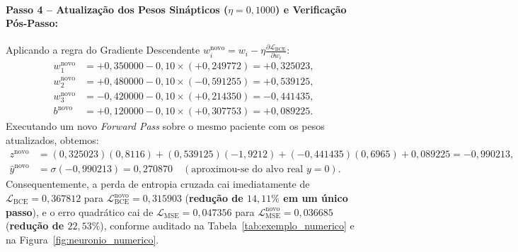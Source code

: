 \documentclass[runningheads]{llncs}
\begin{document}
\paragraph{Passo 4 -- Atualiza\c{c}\~{a}o dos Pesos Sin\'{a}pticos ($\eta = 0{,}1000$) e Verifica\c{c}\~{a}o P\'{o}s-Passo:}
Aplicando a regra do Gradiente Descendente $w_i^{\text{novo}} = w_i - \eta \frac{\partial \mathcal{L}_{\text{BCE}}}{\partial w_i}$:
\begin{align}
    w_1^{\text{novo}} &= +0{,}350000 - 0{,}10 \times (+0{,}249772) = +0{,}325023, \nonumber\\
    w_2^{\text{novo}} &= +0{,}480000 - 0{,}10 \times (-0{,}591255) = +0{,}539125, \nonumber\\
    w_3^{\text{novo}} &= -0{,}420000 - 0{,}10 \times (+0{,}214350) = -0{,}441435, \nonumber\\
    b^{\text{novo}}   &= +0{,}120000 - 0{,}10 \times (+0{,}307753) = +0{,}089225.
\end{align}
Executando um novo \textit{Forward Pass} sobre o mesmo paciente com os pesos atualizados, obtemos:
\begin{align}
    z^{\text{novo}} &= (0{,}325023)(0{,}8116) + (0{,}539125)(-1{,}9212) + (-0{,}441435)(0{,}6965) + 0{,}089225 = -0{,}990213, \nonumber\\
    \hat{y}^{\text{novo}} &= \sigma(-0{,}990213) = 0{,}270870 \quad (\text{aproximou-se do alvo real } y = 0).
\end{align}
Consequentemente, a perda de entropia cruzada cai imediatamente de $\mathcal{L}_{\text{BCE}} = 0{,}367812$ para $\mathcal{L}_{\text{BCE}}^{\text{novo}} = 0{,}315903$ (\textbf{redu\c{c}\~{a}o de $14{,}11\%$ em um \'{u}nico passo}), e o erro quadr\'{a}tico cai de $\mathcal{L}_{\text{MSE}} = 0{,}047356$ para $\mathcal{L}_{\text{MSE}}^{\text{novo}} = 0{,}036685$ (\textbf{redu\c{c}\~{a}o de $22{,}53\%$}), conforme auditado na Tabela~\ref{tab:exemplo_numerico} e na Figura~\ref{fig:neuronio_numerico}.
\end{document}
